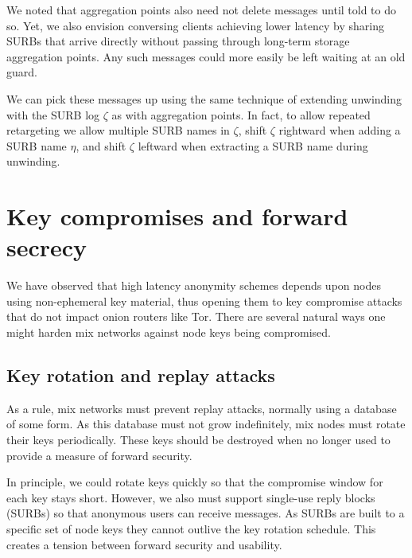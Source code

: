 \documentclass[twoside,letterpaper]{llncs}
\begin{document}
We noted that aggregation points also need not delete messages until
told to do so.  Yet, we also envision conversing clients achieving
lower latency by sharing SURBs that arrive directly without passing
through long-term storage aggregation points.  Any such messages could
more easily be left waiting at an old guard.

We can pick these messages up using the same technique of extending
unwinding with the SURB log $\zeta$ as with aggregation points.  In
fact, to allow repeated retargeting we allow multiple SURB names in
$\zeta$, shift $\zeta$ rightward when adding a SURB name $\eta$, and
shift $\zeta$ leftward when extracting a SURB name during unwinding.



\section{Key compromises and forward secrecy}

We have observed that high latency anonymity schemes depends upon
nodes using non-ephemeral key material, thus opening them to key
compromise attacks that do not impact onion routers like Tor.
There are several natural ways one might harden mix networks against
node keys being compromised. 

\subsection{Key rotation and replay attacks}

As a rule, mix networks must prevent replay attacks, normally using
a database of some form.  As this database must not grow indefinitely,
mix nodes must rotate their keys periodically.  These keys should be
destroyed when no longer used to provide a measure of forward security.

In principle, we could rotate keys quickly so that the compromise
window for each key stays short.  However, we also must
support single-use reply blocks (SURBs) so that anonymous users can
receive messages.  As SURBs are built to a specific set of node
keys they cannot outlive the key rotation schedule.  This creates
a tension between forward security and usability.
\end{document}
